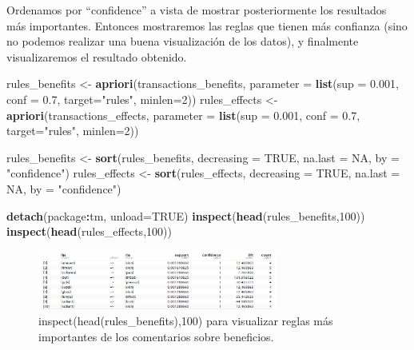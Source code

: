 \documentclass[spanish,]{article}
\newenvironment{Shaded}{\begin{snugshade}}{\end{snugshade}}
\newcommand{\KeywordTok}[1]{\textcolor[rgb]{0.13,0.29,0.53}{\textbf{#1}}}
\newcommand{\DataTypeTok}[1]{\textcolor[rgb]{0.13,0.29,0.53}{#1}}
\newcommand{\DecValTok}[1]{\textcolor[rgb]{0.00,0.00,0.81}{#1}}
\newcommand{\FloatTok}[1]{\textcolor[rgb]{0.00,0.00,0.81}{#1}}
\newcommand{\StringTok}[1]{\textcolor[rgb]{0.31,0.60,0.02}{#1}}
\newcommand{\OtherTok}[1]{\textcolor[rgb]{0.56,0.35,0.01}{#1}}
\newcommand{\OperatorTok}[1]{\textcolor[rgb]{0.81,0.36,0.00}{\textbf{#1}}}
\newcommand{\NormalTok}[1]{#1}
\begin{document}
Ordenamos por ``confidence'' a vista de mostrar posteriormente los
resultados más importantes. Entonces mostraremos las reglas que tienen
más confianza (sino no podemos realizar una buena visualización de los
datos), y finalmente visualizaremos el resultado obtenido.

\begin{Shaded}
\begin{Highlighting}[]
\NormalTok{rules_benefits <-}\StringTok{ }\KeywordTok{apriori}\NormalTok{(transactions_benefits, }\DataTypeTok{parameter =} 
                    \KeywordTok{list}\NormalTok{(}\DataTypeTok{sup =} \FloatTok{0.001}\NormalTok{, }\DataTypeTok{conf =} \FloatTok{0.7}\NormalTok{, }\DataTypeTok{target=}\StringTok{"rules"}\NormalTok{, }\DataTypeTok{minlen=}\DecValTok{2}\NormalTok{))}
\NormalTok{rules_effects <-}\StringTok{ }\KeywordTok{apriori}\NormalTok{(transactions_effects, }\DataTypeTok{parameter =}
                    \KeywordTok{list}\NormalTok{(}\DataTypeTok{sup =} \FloatTok{0.001}\NormalTok{, }\DataTypeTok{conf =} \FloatTok{0.7}\NormalTok{, }\DataTypeTok{target=}\StringTok{"rules"}\NormalTok{, }\DataTypeTok{minlen=}\DecValTok{2}\NormalTok{))}

\NormalTok{rules_benefits <-}\StringTok{ }\KeywordTok{sort}\NormalTok{(rules_benefits, }\DataTypeTok{decreasing =} \OtherTok{TRUE}\NormalTok{, }\DataTypeTok{na.last =} \OtherTok{NA}\NormalTok{,}
                       \DataTypeTok{by =} \StringTok{"confidence"}\NormalTok{)}
\NormalTok{rules_effects <-}\StringTok{ }\KeywordTok{sort}\NormalTok{(rules_effects, }\DataTypeTok{decreasing =} \OtherTok{TRUE}\NormalTok{, }\DataTypeTok{na.last =} \OtherTok{NA}\NormalTok{,}
                      \DataTypeTok{by =} \StringTok{"confidence"}\NormalTok{)}

\KeywordTok{detach}\NormalTok{(package}\OperatorTok{:}\NormalTok{tm, }\DataTypeTok{unload=}\OtherTok{TRUE}\NormalTok{) }
\KeywordTok{inspect}\NormalTok{(}\KeywordTok{head}\NormalTok{(rules_benefits,}\DecValTok{100}\NormalTok{))}
\KeywordTok{inspect}\NormalTok{(}\KeywordTok{head}\NormalTok{(rules_effects,}\DecValTok{100}\NormalTok{))}
\end{Highlighting}
\end{Shaded}

\begin{figure}[ht]
    \centering
    \includegraphics[width=0.7\textwidth]{figuras/asociacion/reglas_general_beneficios.png}
    \caption{inspect(head(rules\_benefits),100) para visualizar reglas más importantes de los comentarios sobre beneficios.}
    \label{fig:asociacion:reglasBenefits}
\end{figure}
\end{document}

